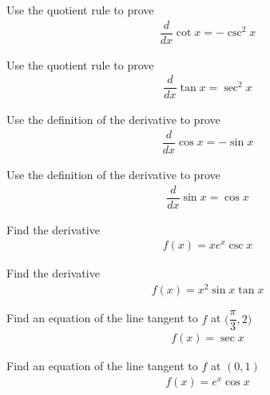 \begin{exercise}
Use the quotient rule to prove
\begin{align*}
    \dfrac{d}{dx} \cot x = -\csc^{2} x
\end{align*}
\end{exercise}

\begin{exercise}
Use the quotient rule to prove
\begin{align*}
    \dfrac{d}{dx} \tan x = \sec^{2} x
\end{align*}
\end{exercise}

\begin{exercise}
Use the definition of the derivative to prove
\begin{align*}
    \dfrac{d}{dx} \cos x = -\sin x
\end{align*}
\end{exercise}

\begin{exercise}
Use the definition of the derivative to prove
\begin{align*}
    \dfrac{d}{dx} \sin x = \cos x
\end{align*}
\end{exercise}

\begin{exercise}
Find the derivative
\begin{align*}
    f(x) = xe^{x}\csc x
\end{align*}
\end{exercise}

\begin{exercise}
Find the derivative
\begin{align*}
    f(x) = x^{2}\sin x \tan x
\end{align*}
\end{exercise}

\begin{exercise}
Find an equation of the line tangent to $f$ at $\Big(\dfrac{\pi}{3}, 2\Big)$
\begin{align*}
    f(x) = \sec x
\end{align*}
\end{exercise}

\begin{exercise}
Find an equation of the line tangent to $f$ at $(0, 1)$
\begin{align*}
    f(x) = e^{x}\cos x 
\end{align*}
\end{exercise}

